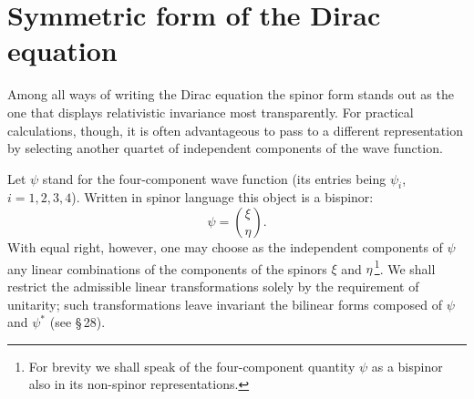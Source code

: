\section{Symmetric form of the Dirac equation}

Among all ways of writing the Dirac equation the spinor form stands out as the one that displays relativistic invariance most transparently. For practical calculations, though, it is often advantageous to pass to a different representation by selecting another quartet of independent components of the wave function.

Let $\psi$ stand for the four-component wave function (its entries being $\psi_i$, $i = 1, 2, 3, 4$). Written in spinor language this object is a bispinor:
\begin{equation}
\psi = \binom{\xi}{\eta}.
\tag{21.1}
\end{equation}
With equal right, however, one may choose as the independent components of $\psi$ any linear combinations of the components of the spinors $\xi$ and $\eta$\,\footnote{For brevity we shall speak of the four-component quantity $\psi$ as a bispinor also in its non-spinor representations.}. We shall restrict the admissible linear transformations solely by the requirement of unitarity; such transformations leave invariant the bilinear forms composed of $\psi$ and $\psi^*$ (see \S\,28).

